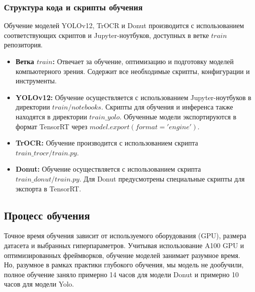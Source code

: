 \documentclass[12pt, a4paper]{article}
\theoremstyle{definition}
\theoremstyle{remark}
\begin{document}
	\subsubsection{Структура кода и скрипты обучения}
	Обучение моделей YOLOv12, TrOCR и Donut производится с использованием соответствующих скриптов и Jupyter-ноутбуков, доступных в ветке $train$ репозитория.
	\begin{itemize}
		\item \textbf{Ветка $train$:} Отвечает за обучение, оптимизацию и подготовку моделей компьютерного зрения. Содержит все необходимые скрипты, конфигурации и инструменты.
		\item \textbf{YOLOv12:} Обучение осуществляется с использованием Jupyter-ноутбуков в директории $train/notebooks$. Скрипты для обучения и инференса также находятся в директории $train\_yolo$. Обученные модели экспортируются в формат TensorRT через $model.export(format='engine')$.
		\item \textbf{TrOCR:} Обучение производится с использованием скрипта $train\_trocr/train.py$.
		\item \textbf{Donut:} Обучение осуществляется с использованием скрипта $train\_donut/train.py$. Для Donut предусмотрены специальные скрипты для экспорта в TensorRT.
	\end{itemize}
	
	\subsection{Процесс обучения}
	Точное время обучения зависит от используемого оборудования (GPU), размера датасета и выбранных гиперпараметров. Учитывая использование A100 GPU и оптимизированных фреймворков, обучение моделей занимает разумное время. Но, разумное в рамках практики глубокого обучения, мы модель не дообучили, полное обучение заняло примерно 14 часов для модели Donut и примерно 10 часов для модели Yolo.
	
\end{document}
